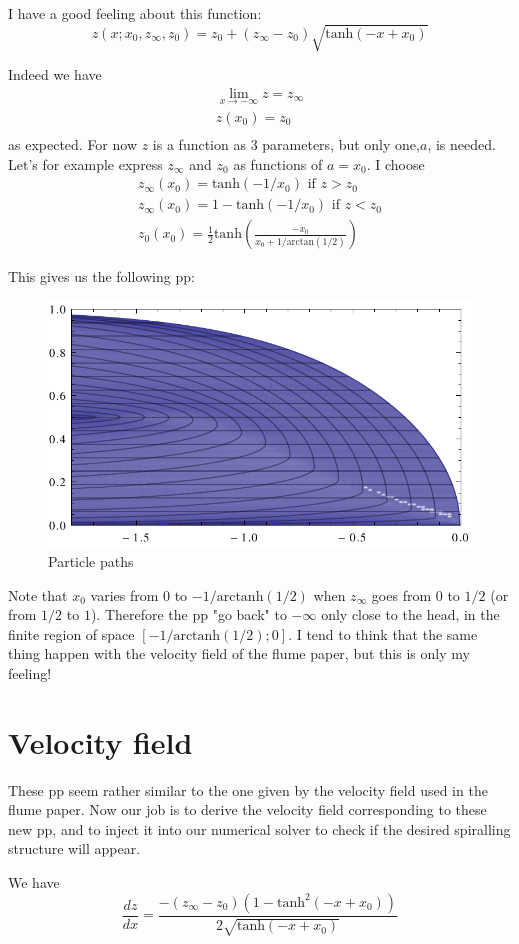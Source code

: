 \documentclass[11pt]{article}
\begin{document}
I have a good feeling about this function:
\[
z(x; x_0, z_\infty, z_0) = z_0 + (z_\infty - z_0) \sqrt {\text{tanh} (-x + x_0)}
\]

Indeed we have 
\[
\begin{matrix}
	\lim_{x \rightarrow -\infty} z = z_\infty \\
	z(x_0) = z_0 \\
\end{matrix}
\]
as expected. For now $z$ is a function as 3 parameters, but only one,$a$, is needed.
Let's for example express $z_\infty$ and $z_0$ as functions of $a = x_0$. I choose
\[
\begin{matrix}
   z_\infty(x_0) = \text{tanh}(-1/x_0) \text{ if } z > z_0 \\
   z_\infty(x_0) = 1 - \text{tanh}(-1/x_0) \text{ if } z < z_0 \\
   z_0(x_0) = \frac{1}{2} \text{tanh}\left(\frac{-x_0}{x_0+1/\text{arctan}(1/2)}\right) 
\end{matrix}
\]

This gives us the following pp:

\begin{figure}[htp]
\centering
\includegraphics[scale=0.9]{remap_particle_paths.pdf}
\caption{Particle paths}
\label{}
\end{figure}

Note that $x_0$ varies from $0$ to $-1/\text{arctanh}(1/2)$ when $z_\infty$ goes from $0$ to $1/2$ (or from $1/2$ to $1$).
Therefore the pp "go back" to $-\infty$ only close to the head, in the finite region of space $[-1/\text{arctanh}(1/2);0]$.
I tend to think that the same thing happen with the velocity field of the flume paper, but this is only my feeling!

\section{Velocity field}

These pp seem rather similar to the one given by the velocity field used in the flume paper.
Now our job is to derive the velocity field corresponding to these new pp, and to inject it into our numerical solver to check if the desired spiralling structure will appear.

We have
\[
\frac{dz}{dx} = \frac{-(z_\infty - z_0)\left(1-\text{tanh}^2(-x+x_0)\right)}
		{2\sqrt{\text{tanh}(-x+x_0)}}
\]
\end{document}
